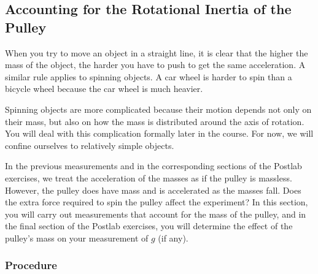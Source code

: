 \documentclass[addpoints]{physlabs}
\begin{document}
\begin{labsection}
\begin{experiment}
\subsection*{Accounting for the Rotational Inertia of the Pulley}

When you try to move an object in a straight line, it is clear that the higher the mass of the object, the harder you have to push to get the same acceleration. A similar rule applies to spinning objects. A car wheel is harder to spin than a bicycle wheel because the car wheel is much heavier.

Spinning objects are more complicated because their motion depends not only on their mass, but also on how the mass is distributed around the axis of rotation. You will deal with this complication formally later in the course. For now, we will confine ourselves to relatively simple objects.

In the previous measurements and in the corresponding sections of the Postlab exercises, we treat the acceleration of the masses as if the pulley is massless. However, the pulley does have mass and is accelerated as the masses fall. Does the extra force required to spin the pulley affect the experiment? In this section, you will carry out measurements that account for the mass of the pulley, and in the final section of the Postlab exercises, you will determine the effect of the pulley’s mass on your measurement of $g$ (if any).

\subsubsection*{Procedure}


\end{experiment}
\end{labsection}
\end{document}
